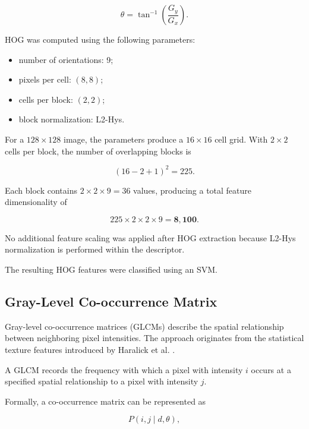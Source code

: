 \documentclass[11pt,a4paper]{article}
\begin{document}
\begin{equation}
\theta = \tan^{-1}\left(\frac{G_y}{G_x}\right).
\end{equation}

HOG was computed using the following parameters:

\begin{itemize}
    \item number of orientations: 9;
    \item pixels per cell: $(8,8)$;
    \item cells per block: $(2,2)$;
    \item block normalization: L2-Hys.
\end{itemize}

For a $128 \times 128$ image, the parameters produce a $16 \times 16$ cell grid. With $2 \times 2$ cells per block, the number of overlapping blocks is

\begin{equation}
(16-2+1)^2 = 225.
\end{equation}

Each block contains $2 \times 2 \times 9 = 36$ values, producing a total feature dimensionality of

\begin{equation}
225 \times 2 \times 2 \times 9
=
\mathbf{8,100}.
\end{equation}

No additional feature scaling was applied after HOG extraction because L2-Hys normalization is performed within the descriptor.

The resulting HOG features were classified using an SVM.

\subsection{Gray-Level Co-occurrence Matrix}

Gray-level co-occurrence matrices (GLCMs) describe the spatial relationship between neighboring pixel intensities. The approach originates from the statistical texture features introduced by Haralick et al. \cite{haralick1973textural}.

A GLCM records the frequency with which a pixel with intensity $i$ occurs at a specified spatial relationship to a pixel with intensity $j$.

Formally, a co-occurrence matrix can be represented as

\begin{equation}
P(i,j \mid d,\theta),
\end{equation}
\end{document}

